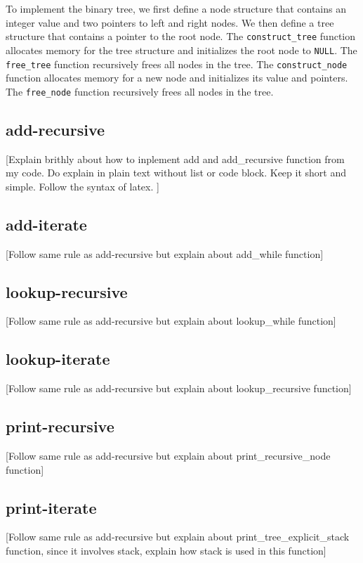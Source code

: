 \documentclass[a4paper,11pt]{article}
\begin{document}
To implement the binary tree, we first define a node structure that contains an integer value and two pointers to left and right nodes. We then define a tree structure that contains a pointer to the root node. The \texttt{construct\_tree} function allocates memory for the tree structure and initializes the root node to \texttt{NULL}. The \texttt{free\_tree} function recursively frees all nodes in the tree. The \texttt{construct\_node} function allocates memory for a new node and initializes its value and pointers. The \texttt{free\_node} function recursively frees all nodes in the tree.

\subsection*{add-recursive}
[Explain brithly about how to inplement add and add_recursive function from my code. Do explain in plain text without list or code block. Keep it short and simple. Follow the syntax of latex. ]

\subsection*{add-iterate}
[Follow same rule as add-recursive but explain about add_while function]

\subsection*{lookup-recursive}
[Follow same rule as add-recursive but explain about lookup_while function]


\subsection*{lookup-iterate}
[Follow same rule as add-recursive but explain about lookup_recursive function]


\subsection*{print-recursive}
[Follow same rule as add-recursive but explain about print_recursive_node function]


\subsection*{print-iterate}
[Follow same rule as add-recursive but explain about print_tree_explicit_stack function, since it involves stack, explain how stack is used in this function]
\end{document}
